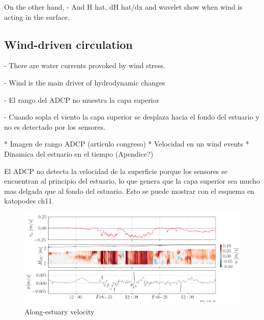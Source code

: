 \documentclass[tesis.tex]{subfiles}
\begin{document}
On the other hand, 
- And H hat, dH hat/dx and wavelet show when wind is acting in the surface.
 
\subsection{Wind-driven circulation}

- There are water currents provoked by wind stress.

- Wind is the main driver of hydrodynamic changes

- El rango del ADCP no muestra la capa superior

- Cuando sopla el viento la capa superior se desplaza hacia el fondo del estuario y no es detectado por los sensores.

* Imagen de rango ADCP (articulo congreso)
* Velocidad en un wind events
* Dinamica del estuario en el tiempo (Apendice?)

El ADCP no detecta la velocidad de la superficie porque los sensores se encuentran al principio del estuario, lo que genera que la capa superior sea mucho mas delgada que al fondo del estuario.
Esto se puede mostrar con el esquema en katopodes ch11.




\begin{figure}[h!]
    \centering
    \includegraphics[width=\textwidth]{Imagenes/vel_wind.png}
    \caption{Along-estuary velocity }
    \label{fig:velwind}
\end{figure}
\end{document}
